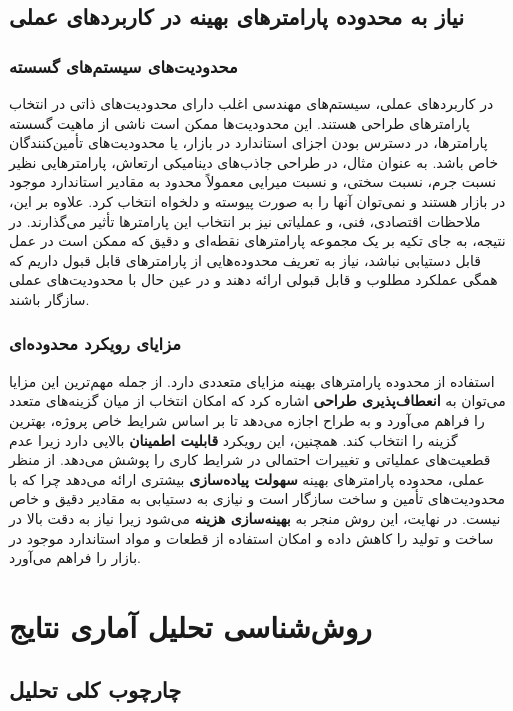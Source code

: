 \subsection{نیاز به محدوده پارامترهای بهینه در کاربردهای عملی}

\subsubsection{محدودیت‌های سیستم‌های گسسته}
در کاربردهای عملی، سیستم‌های مهندسی اغلب دارای محدودیت‌های ذاتی در انتخاب پارامترهای طراحی هستند. این محدودیت‌ها ممکن است ناشی از ماهیت گسسته پارامترها، در دسترس بودن اجزای استاندارد در بازار، یا محدودیت‌های تأمین‌کنندگان خاص باشد. به عنوان مثال، در طراحی جاذب‌های دینامیکی ارتعاش، پارامترهایی نظیر نسبت جرم، نسبت سختی، و نسبت میرایی معمولاً محدود به مقادیر استاندارد موجود در بازار هستند و نمی‌توان آنها را به صورت پیوسته و دلخواه انتخاب کرد. علاوه بر این، ملاحظات اقتصادی، فنی، و عملیاتی نیز بر انتخاب این پارامترها تأثیر می‌گذارند. در نتیجه، به جای تکیه بر یک مجموعه پارامترهای نقطه‌ای و دقیق که ممکن است در عمل قابل دستیابی نباشد، نیاز به تعریف محدوده‌هایی از پارامترهای قابل قبول داریم که همگی عملکرد مطلوب و قابل قبولی ارائه دهند و در عین حال با محدودیت‌های عملی سازگار باشند.

\subsubsection{مزایای رویکرد محدوده‌ای}

استفاده از محدوده پارامترهای بهینه مزایای متعددی دارد. از جمله مهم‌ترین این مزایا می‌توان به \textbf{انعطاف‌پذیری طراحی} اشاره کرد که امکان انتخاب از میان گزینه‌های متعدد را فراهم می‌آورد و به طراح اجازه می‌دهد تا بر اساس شرایط خاص پروژه، بهترین گزینه را انتخاب کند. همچنین، این رویکرد \textbf{قابلیت اطمینان} بالایی دارد زیرا عدم قطعیت‌های عملیاتی و تغییرات احتمالی در شرایط کاری را پوشش می‌دهد. از منظر عملی، محدوده پارامترهای بهینه \textbf{سهولت پیاده‌سازی} بیشتری ارائه می‌دهد چرا که با محدودیت‌های تأمین و ساخت سازگار است و نیازی به دستیابی به مقادیر دقیق و خاص نیست. در نهایت، این روش منجر به \textbf{بهینه‌سازی هزینه} می‌شود زیرا نیاز به دقت بالا در ساخت و تولید را کاهش داده و امکان استفاده از قطعات و مواد استاندارد موجود در بازار را فراهم می‌آورد.

\section{روش‌شناسی تحلیل آماری نتایج}

\subsection{چارچوب کلی تحلیل}

